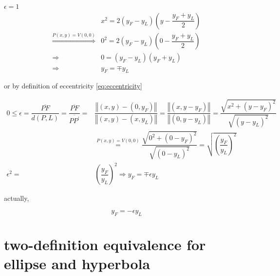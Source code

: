 \documentclass[
]{book}
\theoremstyle{definition}
\theoremstyle{definition}
\theoremstyle{definition}
\theoremstyle{definition}
\theoremstyle{remark}
\begin{document}
\(\epsilon=1\) \[
\begin{aligned}
 & x^{2}=2\left(y_{{\scriptscriptstyle F}}-y_{{\scriptscriptstyle L}}\right)\left(y-\dfrac{y_{{\scriptscriptstyle F}}+y_{{\scriptscriptstyle L}}}{2}\right)\\
\overset{P\left(x,y\right)=V\left(0,0\right)}{\Rightarrow} & 0^{2}=2\left(y_{{\scriptscriptstyle F}}-y_{{\scriptscriptstyle L}}\right)\left(0-\dfrac{y_{{\scriptscriptstyle F}}+y_{{\scriptscriptstyle L}}}{2}\right)\\
\Rightarrow & 0=\left(y_{{\scriptscriptstyle F}}-y_{{\scriptscriptstyle L}}\right)\left(y_{{\scriptscriptstyle F}}+y_{{\scriptscriptstyle L}}\right)\\
\Rightarrow & y_{{\scriptscriptstyle F}}=\mp y_{{\scriptscriptstyle L}}
\end{aligned}
\]

or by definition of eccentricity \eqref{eq:eccentricity}

\[
\begin{aligned}
0\le\epsilon=\dfrac{\overline{PF}}{d\left(P,L\right)}=\dfrac{\overline{PF}}{\overline{PP^{\prime}}}= & \dfrac{\left\Vert \left(x,y\right)-\left(0,y_{{\scriptscriptstyle F}}\right)\right\Vert }{\left\Vert \left(x,y\right)-\left(x,y_{{\scriptscriptstyle L}}\right)\right\Vert }=\dfrac{\left\Vert \left(x,y-y_{{\scriptscriptstyle F}}\right)\right\Vert }{\left\Vert \left(0,y-y_{{\scriptscriptstyle L}}\right)\right\Vert }=\dfrac{\sqrt{x^{2}+\left(y-y_{{\scriptscriptstyle F}}\right)^{2}}}{\sqrt{\left(y-y_{{\scriptscriptstyle L}}\right)^{2}}}\\
 & \overset{P\left(x,y\right)=V\left(0,0\right)}{=}\dfrac{\sqrt{0^{2}+\left(0-y_{{\scriptscriptstyle F}}\right)^{2}}}{\sqrt{\left(0-y_{{\scriptscriptstyle L}}\right)^{2}}}=\sqrt{\left(\dfrac{y_{{\scriptscriptstyle F}}}{y_{{\scriptscriptstyle L}}}\right)^{2}}\\
\epsilon^{2}= & \left(\dfrac{y_{{\scriptscriptstyle F}}}{y_{{\scriptscriptstyle L}}}\right)^{2}\Rightarrow y_{{\scriptscriptstyle F}}=\mp\epsilon y_{{\scriptscriptstyle L}}
\end{aligned}
\]

actually,

\[
y_{{\scriptscriptstyle F}}=-\epsilon y_{{\scriptscriptstyle L}}
\]

\section{two-definition equivalence for ellipse and hyperbola}\label{two-definition-equivalence-for-ellipse-and-hyperbola}
\end{document}
